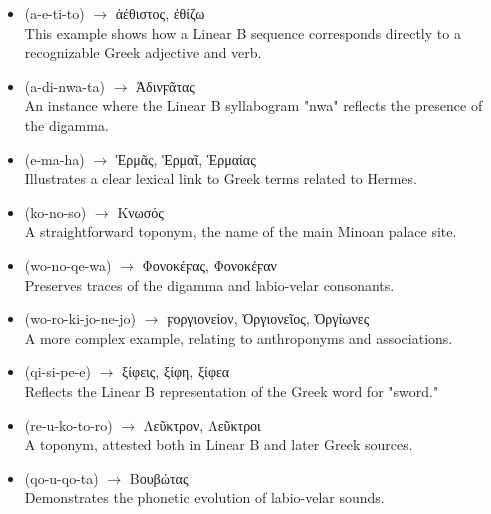 \begin{itemize}  
    \item \textlinb{\Ba\Be\Bti\Bto} (a-e-ti-to) $\rightarrow$ \textgreek{ἀέθιστος}, \textgreek{ἐθίζω} \\  
    This example shows how a Linear B sequence corresponds directly to a recognizable Greek adjective and verb.

    \item \textlinb{\Ba\Bdi\Bnwa\Bta} (a-di-nwa-ta) $\rightarrow$ \textgreek{Ἀδινϝᾶτας} \\  
    An instance where the Linear B syllabogram "nwa" reflects the presence of the digamma.

    \item \textlinb{\Be\Bma\Baii} (e-ma-ha) $\rightarrow$ \textgreek{Ἑρμᾶς}, \textgreek{Ἑρμαῖ}, \textgreek{Ἑρμαίας} \\  
    Illustrates a clear lexical link to Greek terms related to Hermes.

    \item \textlinb{\Bko\Bno\Bso} (ko-no-so) $\rightarrow$ \textgreek{Κνωσός}\\  
    A straightforward toponym, the name of the main Minoan palace site.

    \item \textlinb{\Bwo\Bno\Bqe\Bwa} (wo-no-qe-wa) $\rightarrow$ \textgreek{Φονοκέϝας}, \textgreek{Φονοκέϝαν} \\  
    Preserves traces of the digamma and labio-velar consonants.

    \item \textlinb{\Bwo\Bro\Bki\Bjo\Bne\Bjo} (wo-ro-ki-jo-ne-jo) $\rightarrow$ \textgreek{ϝοργιονείον}, \textgreek{Ὀργιονεῖος}, \textgreek{Ὀργίωνες} \\  
    A more complex example, relating to anthroponyms and associations.

    \item \textlinb{\Bqi\Bsi\Bpe\Be} (qi-si-pe-e) $\rightarrow$ \textgreek{ξίφεις}, \textgreek{ξίφη}, \textgreek{ξίφεα} \\  
    Reflects the Linear B representation of the Greek word for "sword."  

    \item \textlinb{\Bre\Bu\Bko\Bto\Bro} (re-u-ko-to-ro) $\rightarrow$ \textgreek{Λεῦκτρον}, \textgreek{Λεῦκτροι} \\  
    A toponym, attested both in Linear B and later Greek sources.

    \item \textlinb{\Bqo\Bu\Bqo\Bta} (qo-u-qo-ta) $\rightarrow$ \textgreek{Βουβώτας} \\  
    Demonstrates the phonetic evolution of labio-velar sounds.


\end{itemize}
